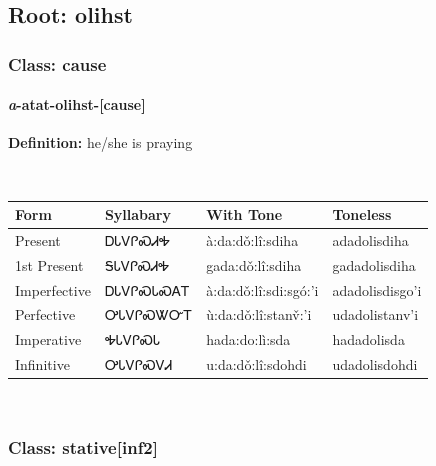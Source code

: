 \needspace{4in}
\subsection*{Root: olihst}
\nopagebreak
{}
\needspace{3in}
\subsubsection*{Class: cause}
\nopagebreak
\needspace{2in}
\paragraph*{\textit{a}{-}atat{-}\textbf{olihst}{-}[cause]}
\nopagebreak
\textbf{Definition: } he/she is praying
\\[0.5em]
\begin{tabularx}{\textwidth}{l X X X}%
\toprule%
\textbf{Form}&\textbf{Syllabary}&\textbf{With Tone}&\textbf{Toneless}\\%
\midrule%
Present&ᎠᏓᏙᎵᏍᏗᎭ&à:da:dǒ:lî:sdiha&adadolisdiha\\%
1st Present&ᎦᏓᏙᎵᏍᏗᎭ&gada:dǒ:lî:sdiha&gadadolisdiha\\%
Imperfective&ᎠᏓᏙᎵᏍᏓᏍᎪᎢ&à:da:dǒ:lî:sdi:sgó:’i&adadolisdisgo’i\\%
Perfective&ᎤᏓᏙᎵᏍᏔᏅᎢ&ù:da:dǒ:lî:stanv̌:’i&udadolistanv’i\\%
Imperative&ᎭᏓᏙᎵᏍᏓ&hada:do:lì:sda&hadadolisda\\%
Infinitive&ᎤᏓᏙᎵᏍᏙᏗ&u:da:dǒ:lî:sdohdi&udadolisdohdi\\%
\bottomrule%
\end{tabularx}
\\[1em]
\needspace{3in}
\subsubsection*{Class: stative[inf2]}
\nopagebreak
\needspace{2in}

